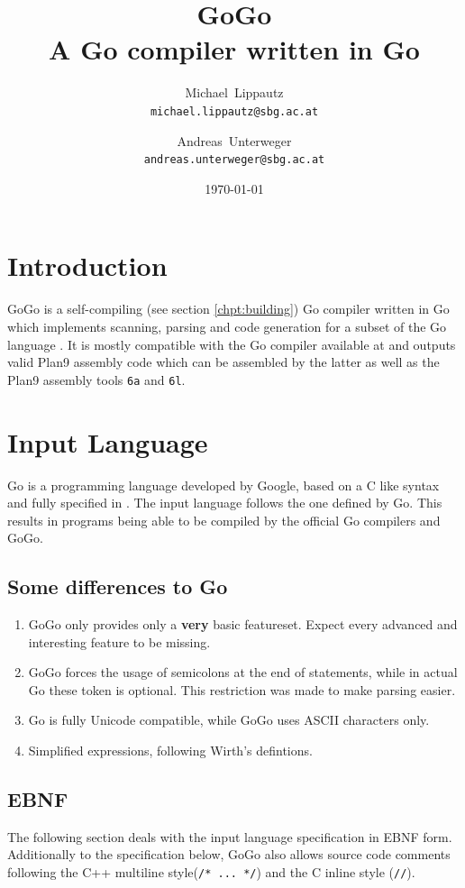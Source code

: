 \documentclass[a4paper]{scrartcl}
\title{GoGo\\ \large{A Go compiler written in Go}}
\author{
  Michael~Lippautz \\ \normalsize{\texttt{michael.lippautz@sbg.ac.at}} 
    \and 
  Andreas~Unterweger \\ \normalsize{\texttt{andreas.unterweger@sbg.ac.at}} 
}
\date{\today}
\let\chapter\section
\let\section\subsection
\let\subsection\subsubsection
\let\subsubsection\paragraph
\let\paragraph\subparagraph
\let\subparagraph\undefined
\begin{document}
  \maketitle
  \tableofcontents

  \chapter{Introduction}
    GoGo is a self-compiling (see section \ref{chpt:building}) Go compiler 
    written in Go which implements scanning, parsing and code generation for a 
    subset of the Go language \cite{goo10}. It is mostly compatible with the Go 
    compiler available at \cite{goo10} and outputs valid Plan9 assembly code 
    which can be assembled by the latter as well as the Plan9 assembly tools 
    \texttt{6a} and \texttt{6l}\cite{pik00}.\\


  \chapter{Input Language}
    Go is a programming language developed by Google, based on a C like syntax and fully specified in \cite{goo10}. The input language follows the one defined by Go. This results in programs being able to be compiled by the official Go compilers and GoGo.

    \section{Some differences to Go}
      \begin{enumerate}
        \item GoGo only provides only a \textbf{very} basic featureset. Expect 
          every advanced and interesting feature to be missing.
        \item GoGo forces the usage of semicolons at the end of statements, 
          while in actual Go these token is optional. This restriction was made 
          to make parsing easier.
        \item Go is fully Unicode compatible, while GoGo uses ASCII characters only.
        \item Simplified expressions, following Wirth's \cite{wir96} defintions.
      \end{enumerate}

    \section{EBNF}
    \label{sec:ebnf}
      The following section deals with the input language specification in 
      EBNF form. Additionally to the specification below, GoGo also allows 
      source code comments following the C++ multiline style(\texttt{/* ... */}) 
      and the C inline style (\texttt{//}).
\end{document}

